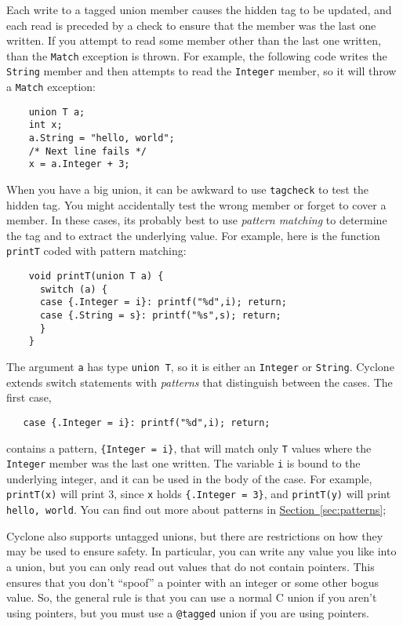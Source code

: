 Each write to a tagged union member causes the hidden tag to
be updated, and each read is preceded by a 
check to ensure that the member was the last one written.
If you attempt to read some member other than the last one
written, than the \texttt{Match}
exception is thrown.  For example, the following code writes
the \texttt{String} member and then attempts to read the
\texttt{Integer} member, so it will throw a \texttt{Match}
exception:
\begin{verbatim}
    union T a;
    int x;
    a.String = "hello, world";
    /* Next line fails */
    x = a.Integer + 3;
\end{verbatim}

When you have a big union, it can be awkward to use \texttt{tagcheck}
to test the hidden tag.  You might accidentally test the wrong
member or forget to cover a member.  In these cases, its probably
best to use \emph{pattern matching} to determine the tag and 
to extract the underlying value.  For
example, here is the function \texttt{printT} coded with
pattern matching:
\begin{verbatim}
    void printT(union T a) {
      switch (a) {
      case {.Integer = i}: printf("%d",i); return;
      case {.String = s}: printf("%s",s); return;
      }
    }
\end{verbatim}
The argument \texttt{a} has type \texttt{union T}, so it is either
an \texttt{Integer} or \texttt{String}.  Cyclone
extends switch statements with \emph{patterns} that distinguish
between the cases.  The first case,
\begin{verbatim}
   case {.Integer = i}: printf("%d",i); return;
\end{verbatim}
contains a pattern, \texttt{\{Integer = i\}}, that will match only 
\texttt{T} values where the \texttt{Integer} member was the last
one written.  The variable
\texttt{i} is bound to the underlying integer, and it can be used in
the body of the case.  For example, \texttt{printT(x)} will print 3,
since \texttt{x} holds \texttt{\{.Integer = 3\}}, and
\texttt{printT(y)} will print \texttt{hello, world}.
You can find out more about patterns in
\hyperref[{sec:patterns}]{Section~\ref{sec:patterns}}; 

Cyclone also supports untagged unions, but there are restrictions
on how they may be used to ensure safety.  In particular, you can
write any value you like into a union, but you can only read out
values that do not contain pointers.  This ensures that you don't
``spoof'' a pointer with an integer or some other bogus value.
So, the general rule is that you can use a normal C union if
you aren't using pointers, but you must use a \texttt{@tagged}
union if you are using pointers.  

